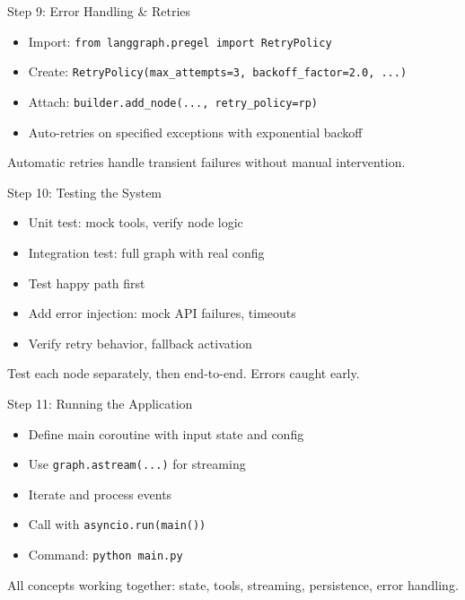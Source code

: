 \documentclass[aspectratio=169,11pt]{beamer}
\begin{document}
\begin{frame}{Step 9: Error Handling \& Retries}
\setlength{\itemsep}{1pt}
\begin{itemize}
\item Import: \texttt{from langgraph.pregel import RetryPolicy}
\item Create: \texttt{RetryPolicy(max\_attempts=3, backoff\_factor=2.0, ...)}
\item Attach: \texttt{builder.add\_node(..., retry\_policy=rp)}
\item Auto-retries on specified exceptions with exponential backoff
\end{itemize}
\vspace{0.1cm}
\begin{tipbox}[Resilience]
Automatic retries handle transient failures without manual intervention.
\end{tipbox}
\end{frame}

\begin{frame}{Step 10: Testing the System}
\setlength{\itemsep}{1pt}
\begin{itemize}
\item Unit test: mock tools, verify node logic
\item Integration test: full graph with real config
\item Test happy path first
\item Add error injection: mock API failures, timeouts
\item Verify retry behavior, fallback activation
\end{itemize}
\vspace{0.1cm}
\begin{tipbox}
Test each node separately, then end-to-end. Errors caught early.
\end{tipbox}
\end{frame}

\begin{frame}{Step 11: Running the Application}
\setlength{\itemsep}{1pt}
\begin{itemize}
\item Define main coroutine with input state and config
\item Use \texttt{graph.astream(...)} for streaming
\item Iterate and process events
\item Call with \texttt{asyncio.run(main())}
\item Command: \texttt{python main.py}
\end{itemize}
\vspace{0.1cm}
\begin{tipbox}
All concepts working together: state, tools, streaming, persistence, error handling.
\end{tipbox}
\end{frame}
\end{document}
